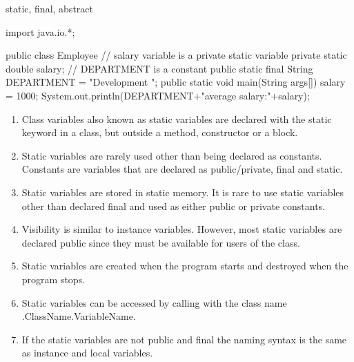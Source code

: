 \documentclass[11pt]{beamer}
\begin{document}

\begin{frame}{static, final, abstract}

\begin{java}

import java.io.*;

public class Employee{
// salary variable is a private static variable
private static double salary;
// DEPARTMENT is a constant
public static final String DEPARTMENT = "Development ";
public static void main(String args[]){
salary = 1000;
System.out.println(DEPARTMENT+"average salary:"+salary);
}
}
\end{java}
\begin{enumerate}
\item Class variables also known as static variables are declared with the static keyword in a class, but outside a method, constructor or a block.
\item Static variables are rarely used other than being declared as constants. Constants are variables that are declared as public/private, final and static. 
\item Static variables are stored in static memory. It is rare to use static variables other than declared final and used as either public or private constants.
\item Visibility is similar to instance variables. However, most static variables are declared public since they must be available for users of the class.
\item Static variables are created when the program starts and destroyed when the program stops.
\item Static variables can be accessed by calling with the class name .ClassName.VariableName. 
\item If the static variables are not public and final the naming syntax is the same as instance and local variables.  
\end{enumerate}


\end{frame}
\end{document}
